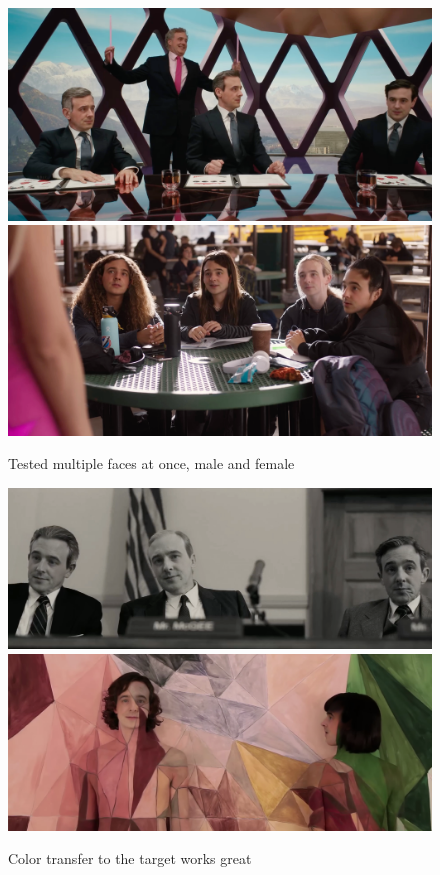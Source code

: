 \documentclass[
  a4paper,  %
  twoside,  %
  bibliography=totoc,
  headsepline,
  cleardoublepage=empty,
  parskip=half,
  draft=false
]{scrbook}
\begin{document}
\begin{figure}[h]
  \centering
  \includegraphics[width=1\textwidth]{./graphics/images/inswapper/multiple1.png}
  \includegraphics[width=1\textwidth]{./graphics/images/inswapper/multiple2.png}
  \caption{Tested multiple faces at once, male and female}
\end{figure}
\begin{figure}[h]
  \centering
  \includegraphics[width=1\textwidth]{./graphics/images/inswapper/oppenheimer2.png}
  \includegraphics[width=1\textwidth]{./graphics/images/inswapper/kimbra.png}
  \caption{Color transfer to the target works great}
\end{figure}
\end{document}
